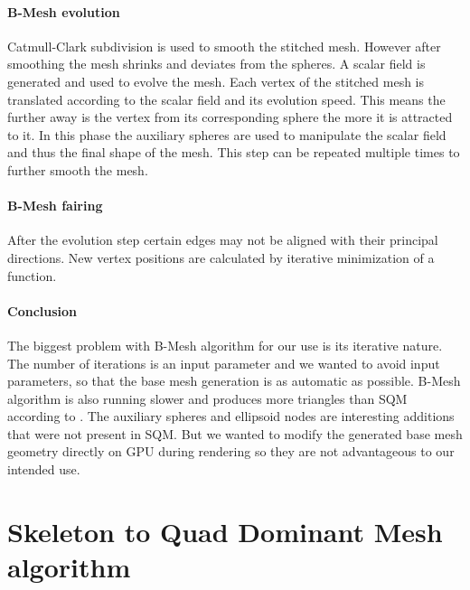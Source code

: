 \paragraph{B-Mesh evolution}
Catmull-Clark subdivision is used to smooth the stitched mesh. However after smoothing the mesh shrinks and deviates from the spheres. A scalar field is generated and used to evolve the mesh. Each vertex of the stitched mesh is translated according to the scalar field and its evolution speed. This means the further away is the vertex from its corresponding sphere the more it is attracted to it. In this phase the auxiliary spheres are used to manipulate the scalar field and thus the final shape of the mesh. This step can be repeated multiple times to further smooth the mesh.

\paragraph{B-Mesh fairing}
After the evolution step certain edges may not be aligned with their principal directions. New vertex positions are calculated by iterative minimization of a function.

\paragraph{Conclusion}
The biggest problem with B-Mesh algorithm for our use is its iterative nature. The number of iterations is an input parameter and we wanted to avoid input parameters, so that the base mesh generation is as automatic as possible. B-Mesh algorithm is also running slower and produces more triangles than SQM according to \cite{SQM}. The auxiliary spheres and ellipsoid nodes are interesting additions that were not present in SQM. But we wanted to modify the generated base mesh geometry directly on GPU during rendering so they are not advantageous to our intended use.

\section{Skeleton to Quad Dominant Mesh algorithm}
